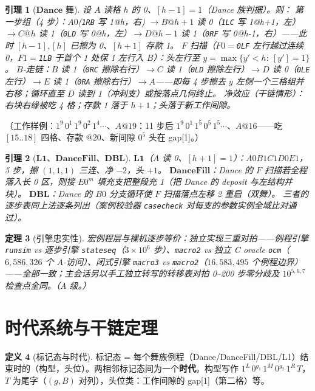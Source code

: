 \documentclass[11pt]{ctexart}
\newtheorem{theorem}{定理}[section]
\newtheorem{lemma}[theorem]{引理}
\theoremstyle{definition}
\newtheorem{definition}[theorem]{定义}
\begin{document}
\begin{lemma}[$\mathbf{Dance}$ 舞]\label{lem:Dance}
设 $A$ 读格 $h$ 的 0、$[h{-}1]=1$（Dance 族判据）。则：
\emph{第一步组}（4 步）：$A0$(\texttt{1RB} 写 1@h，右) $\to B@h{+}1$ 读 0（\texttt{1LC} 写 1@h{+}1，左）$\to C@h$ 读 1（\texttt{0LD} 写 0@h，左）$\to D@h{-}1$ 读 1（\texttt{0RF} 写 0@h{-}1，右）——此时 $[h{-}1],[h]$ 已擦为 0、$[h{+}1]$ 存款 1。
\emph{$F$ 扫描}（$F0=$\texttt{0LF} 左行越过连续 0，$F1=$\texttt{1LB} 于首个 1 处保 1 左行入 $B$）：头左行至 $y=\max\{y'<h:\ [y']=1\}$。
\emph{$B$-走链}：$B$ 读 1（\texttt{0RC} 擦除右行）$\to C$ 读 1（\texttt{0LD} 擦除左行）$\to D$ 读 0（\texttt{0LE} 左行）$\to E$ 读 1（\texttt{0RA} 擦除右行）$\to A$——即每 4 步擦去 $y$ 左侧一个三格组并右移；循环直至 $D$ 读到 1（冲刺支）或按落点几何终止。
净效应（干链情形）：右块右缘被吃 4 格；存款 1 落于 $h{+}1$；头落于新工作间隙。
\end{lemma}
（工作样例：$1^9\,0^1\,1^9\,0^2\,1^4\cdots$、$A@19$：11 步后 $1^9\,0^1\,1^5\,0^5\,1^5\cdots$、$A@16$——吃 $[15..18]$ 四格、存款 $@20$、新间隙 $0^5$ 头在 gap[1]。）

\begin{lemma}[$\mathbf{L1}$、$\mathbf{DanceFill}$、$\mathbf{DBL}$]\label{lem:minor}
$\mathbf{L1}$（$A$ 读 0、$[h{+}1]=1$）：$A0B1C1D0E1$，5 步，擦 $(1,1,1)$ 三连、净 $-2$，头 $+1$。
$\mathbf{DanceFill}$：Dance 的 $F$ 扫描若全程落入长 0 区，则接 $E0^m$ 填充支把整段充 1（把 Dance 的 deposit 与左结构并块）。
$\mathbf{DBL}$：Dance 的 $B0$ 分支循环使 $F$ 扫描落点左移 2 重启（双舞）。
三者的逐步表同上法逐条列出（案例校验器 \texttt{casecheck} 对每支的参数实例全域比对通过）。
\end{lemma}

\begin{theorem}[引擎忠实性]\label{thm:faith}
宏例程层与裸机逐步等价：独立实现三重对拍——例程引擎 \texttt{runsim} vs 逐步引擎 \texttt{stateseq}（$3\times10^6$ 步）、\texttt{macro2} vs 独立 C oracle \texttt{ocm}（$6{,}586{,}326$ 个 $A$-访问）、闭式引擎 \texttt{macro3} vs \texttt{macro2}（$16{,}583{,}495$ 个例程边界）——全部一致；主会话另以手工独立转写的转移表对拍 0--200 步零分歧及 $10^{5,6,7}$ 检查点全同。（A 级。）
\end{theorem}

\section{时代系统与干链定理}

\begin{definition}[标记态与时代]\label{def:era}
标记态 = 每个舞族例程（Dance/DanceFill/DBL/L1）结束时的（构型，头位）。两相邻标记态间为一个\textbf{时代}。构型写作 $1^L\,0^{g_1}\,1^M\,0^{g_2}\,1^R\,T$，$T$ 为尾字（$(g,B)$ 对列），头位类：工作间隙的 gap[1]（第二格）等。
\end{definition}
\end{document}
